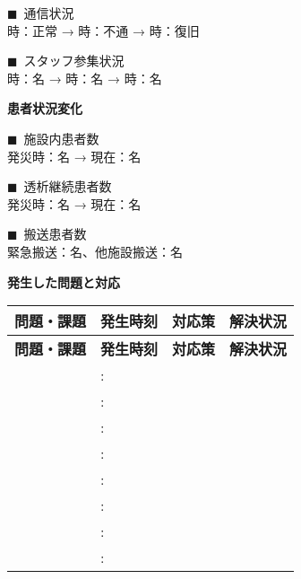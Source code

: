 \documentclass[a4paper,12pt]{jarticle}
\newcommand{\checkedbox}{$\blacksquare$\ }
\newcommand{\underlinespace}[1]{\underline{\hspace{#1}}}
\begin{document}
\noindent
\checkedbox 通信状況 \\
\hspace*{1cm}\underlinespace{1cm}時：正常 → \underlinespace{1cm}時：不通 → \underlinespace{1cm}時：復旧

\vspace{2mm}

\noindent
\checkedbox スタッフ参集状況 \\
\hspace*{1cm}\underlinespace{1cm}時：\underlinespace{1cm}名 → \underlinespace{1cm}時：\underlinespace{1cm}名 → \underlinespace{1cm}時：\underlinespace{1cm}名

\vspace{5mm}

\begin{center}
\textbf{\large 患者状況変化}
\end{center}

\vspace{3mm}

\noindent
\checkedbox 施設内患者数 \\
発災時：\underlinespace{1.5cm}名 → 現在：\underlinespace{1.5cm}名

\vspace{2mm}

\noindent
\checkedbox 透析継続患者数 \\
発災時：\underlinespace{1.5cm}名 → 現在：\underlinespace{1.5cm}名

\vspace{2mm}

\noindent
\checkedbox 搬送患者数 \\
緊急搬送：\underlinespace{1.5cm}名、他施設搬送：\underlinespace{1.5cm}名

\vspace{5mm}

\begin{center}
\textbf{\large 発生した問題と対応}
\end{center}

\vspace{3mm}

\begin{longtable}{|p{3cm}|p{2cm}|p{3.5cm}|p{3.5cm}|}
\hline
\textbf{問題・課題} & \textbf{発生時刻} & \textbf{対応策} & \textbf{解決状況} \\
\hline
\endfirsthead
\hline
\textbf{問題・課題} & \textbf{発生時刻} & \textbf{対応策} & \textbf{解決状況} \\
\hline
\endhead
 & : &  &  \\[0.5cm]
\hline
 & : &  &  \\[0.5cm]
\hline
 & : &  &  \\[0.5cm]
\hline
 & : &  &  \\[0.5cm]
\hline
 & : &  &  \\[0.5cm]
\hline
 & : &  &  \\[0.5cm]
\hline
 & : &  &  \\[0.5cm]
\hline
 & : &  &  \\[0.5cm]
\hline
\end{longtable}
\end{document}
